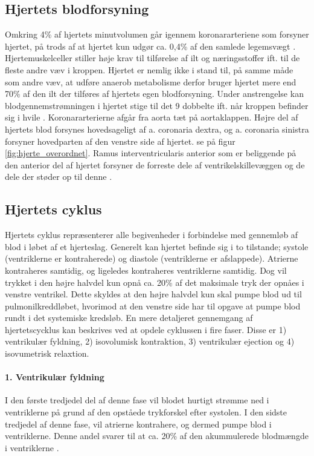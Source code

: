 \subsection{Hjertets blodforsyning}
Omkring 4\% af hjertets minutvolumen går igennem koronararteriene som forsyner hjertet, på trods af at hjertet kun udgør ca. 0,4\% af den samlede legemsvægt \cite{gronanatomi}. Hjertemuskelceller stiller høje krav til tilførelse af ilt og næringsstoffer ift. til de fleste andre væv i kroppen. Hjertet er nemlig ikke i stand til, på samme måde som andre væv, at udføre anaerob metabolisme derfor bruger hjertet mere end 70\% af den ilt der tilføres af hjertets egen blodforsyning. Under anstrengelse kan blodgennemstrømningen i hjertet stige til det 9 dobbelte ift. når kroppen befinder sig i hvile \cite{martini}. Koronararterierne afgår fra aorta tæt på aortaklappen. Højre del af hjertets blod forsynes hovedsageligt af a. coronaria dextra, og a. coronaria sinistra forsyner hovedparten af den venstre side af hjertet. se på figur \ref{fig:hjerte_overordnet}. Ramus interventricularis anterior som er beliggende på den anterior del af hjertet forsyner de forreste dele af ventrikelskillevæggen og de dele der støder op til denne \cite{gronanatomi}.

\newpage
\subsection{Hjertets cyklus}
Hjertets cyklus repræsenterer alle begivenheder i forbindelse med gennemløb af blod i løbet af et hjerteslag. Generelt kan hjertet befinde sig i to tilstande; systole (ventriklerne er kontraherede) og diastole (ventriklerne er afslappede). Atrierne kontraheres samtidig, og ligeledes kontraheres ventriklerne samtidig. Dog vil trykket i den højre halvdel kun opnå ca. 20\% af det maksimale tryk der opnåes i venstre ventrikel. Dette skyldes at den højre halvdel kun skal pumpe blod ud til pulmonilkreddløbet, hvorimod at den venstre side har til opgave at pumpe blod rundt i det systemiske kredsløb. En mere detaljeret gennemgang af hjertetscycklus kan beskrives ved at opdele cyklussen i fire faser. Disse er 1) ventrikulær fyldning, 2) isovolumisk kontraktion, 3) ventrikulær ejection og 4) isovumetrisk relaxtion.

\paragraph*{1. Ventrikulær fyldning}
I den første tredjedel del af denne fase vil blodet hurtigt strømme ned i ventriklerne på grund af den opståede trykforskel efter systolen. I den sidste tredjedel af denne fase, vil atrierne kontrahere, og dermed pumpe blod i ventriklerne. Denne andel svarer til at ca. 20\% af den akummulerede blodmængde i ventriklerne \cite{guyton2006}. 

